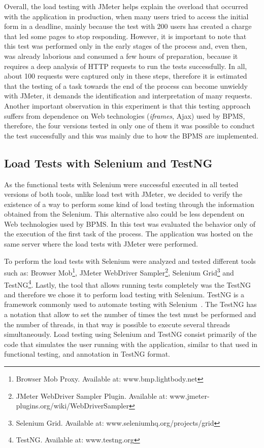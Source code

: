 \documentclass[runningheads,a4paper]{llncs}
\begin{document}
Overall, the load testing with JMeter helps explain the overload that occurred with the application in production, when many users tried to access the initial form in a deadline, mainly because the test with 200 users has created a charge that led some pages to stop responding. However, it is important to note that this test was performed only in the early stages of the process and, even then, was already laborious and consumed a few hours of preparation, because it requires a deep analysis of HTTP requests to run the tests successfully. In all, about 100 requests were captured only in these steps, therefore it is estimated that the testing of a task towards the end of the process can become unwieldy with JMeter, it demands the identification and interpretation of many requests. Another important observation in this experiment is that this testing approach suffers from dependence on Web technologies (\emph{iframes}, Ajax) used by BPMS, therefore, the four versions tested in only one of them it was possible to conduct the test successfully and this was mainly due to how the BPMS are implemented.


\subsection{Load Tests with Selenium and TestNG}
As the functional tests with Selenium were successful executed in all tested versions of both tools, unlike load test with JMeter, we decided to verify the existence of a way to perform some kind of load testing through the information obtained from the Selenium. This alternative also could be less dependent on Web technologies used by BPMS. In this test was evaluated the behavior only of the execution of the first task of the process. The application was hosted on the same server where the load tests with JMeter were performed.

To perform the load tests with Selenium were analyzed and tested different tools such as: Browser Mob\footnote{Browser Mob Proxy. Available at: www.bmp.lightbody.net}, JMeter WebDriver Sampler\footnote{JMeter WebDriver Sampler Plugin. Available at: www.jmeter-plugins.org/wiki/WebDriverSampler}, Selenium Grid\footnote{Selenium Grid. Available at: www.seleniumhq.org/projects/grid} and TestNG\footnote{TestNG. Available at: www.testng.org}. Lastly, the tool that allows running tests completely was the TestNG and therefore we chose it to perform load testing with Selenium. TestNG is a framework commonly used to automate testing with Selenium~\cite{bindal2014test}. The TestNG has a notation that allow to set the number of times the test must be performed and the number of threads, in that way is possible to execute several threads simultaneously. Load testing using Selenium and TestNG consist primarily of the code that simulates the user running with the application, similar to that used in functional testing, and annotation in TestNG format.
\end{document}
